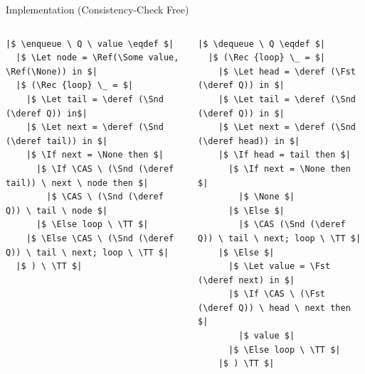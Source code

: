 \documentclass[9pt,xcolor={dvipsnames}]{beamer}
\newcommand{\enqueue}{\operatorname{enqueue}}
\newcommand{\dequeue}{\operatorname{dequeue}}
\begin{document}
\begin{frame}[fragile]{Implementation (Consistency-Check Free)}
\begin{columns}
\begin{column}{0.5\textwidth}
\begin{verbatim}
|$ \enqueue \ Q \ value \eqdef $|
  |$ \Let node = \Ref(\Some value, \Ref(\None)) in $|
  |$ (\Rec {loop} \_ = $|
    |$ \Let tail = \deref (\Snd (\deref Q)) in$|
    |$ \Let next = \deref (\Snd (\deref tail)) in $|
    |$ \If next = \None then $|
      |$ \If \CAS \ (\Snd (\deref tail)) \ next \ node then $|
        |$ \CAS \ (\Snd (\deref Q)) \ tail \ node $|
      |$ \Else loop \ \TT $|
    |$ \Else \CAS \ (\Snd (\deref Q)) \ tail \ next; loop \ \TT $|
  |$ ) \ \TT $|
      \end{verbatim}
    \end{column}
    \begin{column}{0.5\textwidth}
      \begin{verbatim}
|$ \dequeue \ Q \eqdef $|
  |$ (\Rec {loop} \_ = $|
    |$ \Let head = \deref (\Fst (\deref Q)) in $|
    |$ \Let tail = \deref (\Snd (\deref Q)) in $|
    |$ \Let next = \deref (\Snd (\deref head)) in $|
    |$ \If head = tail then $|
      |$ \If next = \None then $|
        |$ \None $|
      |$ \Else $|
        |$ \CAS (\Snd (\deref Q)) \ tail \ next; loop \ \TT $|
    |$ \Else $|
      |$ \Let value = \Fst (\deref next) in $|
      |$ \If \CAS \ (\Fst (\deref Q)) \ head \ next then $|
        |$ value $|
      |$ \Else loop \ \TT $|
    |$ ) \TT $|
        \end{verbatim}
    \end{column}
  \end{columns}
\end{frame}
\end{document}
